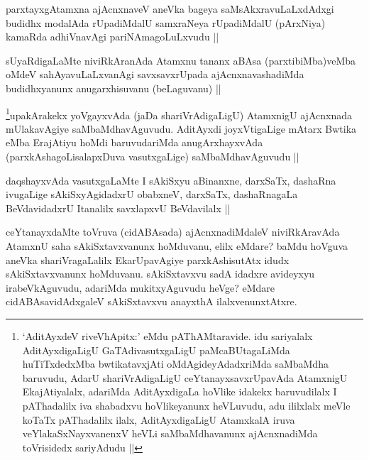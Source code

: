 \begin{artha}
parxtayxgAtamxna ajAcnxnaveV aneVka bageya saMsAkxravuLaLxdAdxgi budidhx modalAda rUpadiMdalU samxraNeya rUpadiMdalU (pArxNiya) kamaRda adhiVnavAgi pariNAmagoLuLxvudu ||
\end{artha}

\begin{artha}
sUyaRdigaLaMte niviRkAranAda Atamxnu tananx aBAsa (parxtibiMba)veMba oMdeV sahAyavuLaLxvanAgi savxsavxrUpada ajAcnxnavashadiMda budidhxyanunx anugarxhisuvanu (beLaguvanu) ||
\end{artha}

\begin{artha}
\footnote[1]{`AditAyxdeV riveVhApitx:' eMdu pAThAMtaravide. idu sariyalalx AditAyxdigaLigU GaTAdivasutxgaLigU paMcaBUtagaLiMda huTiTxdedxMba bwtikatavxjAti oMdAgideyAdadxriMda saMbaMdha baruvudu, AdarU shariVrAdigaLigU ceYtanayxsavxrUpavAda AtamxnigU EkajAtiyalalx, adariMda AditAyxdigaLa hoVlike idakekx baruvudilalx I pAThadalilx iva shabadxvu hoVlikeyanunx heVLuvudu, adu ililxlalx meVle koTaTx pAThadalilx ilalx, AditAyxdigaLigU AtamxkalA iruva veYlakaSxNayxvanenxV heVLi saMbaMdhavanunx ajAcnxnadiMda toVrisidedx sariyAdudu ||}upakArakekx yoVgayxvAda (jaDa shariVrAdigaLigU) AtamxnigU ajAcnxnada mUlakavAgiye saMbaMdhavAguvudu. AditAyxdi joyxVtigaLige mAtarx Bwtika eMba ErajAtiyu hoMdi baruvudariMda anugArxhayxvAda (parxkAshagoLisalapxDuva vasutxgaLige) saMbaMdhavAguvudu ||
\end{artha}

\begin{artha}
daqshayxvAda vasutxgaLaMte I sAkiSxyu aBinanxne, darxSaTx, dashaRna ivugaLige sAkiSxyAgidadxrU obabxneV, darxSaTx, dashaRnagaLa BeVdavidadxrU Itanalilx savxlapxvU BeVdavilalx ||
\end{artha}

\begin{artha}
ceYtanayxdaMte toVruva (cidABAsada) ajAcnxnadiMdaleV niviRkAravAda AtamxnU saha sAkiSxtavxvanunx hoMduvanu, elilx eMdare? baMdu hoVguva aneVka shariVragaLalilx EkarUpavAgiye parxkAshisutAtx idudx sAkiSxtavxvanunx hoMduvanu. sAkiSxtavxvu sadA idadxre avideyxyu irabeVkAguvudu, adariMda mukitxyAguvudu heVge? eMdare cidABAsavidAdxgaleV sAkiSxtavxvu anayxthA ilalxvenunxtAtxre. 
\end{artha}

